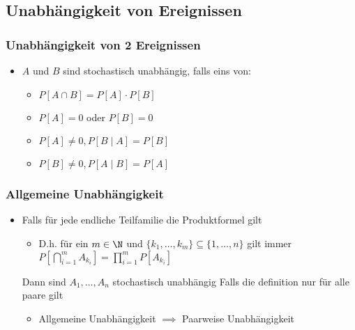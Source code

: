 \subsection{Unabhängigkeit von Ereignissen}
\subsubsection{Unabhängigkeit von 2 Ereignissen}
\begin{itemize}
    \item $A$ und $B$ sind stochastisch unabhängig, falls eins von:
        \begin{itemize}
            \item $P[A \cap B] = P[A] \cdot P[B]$
            \item $P[A]=0$ oder $P[B] = 0$
            \item $P[A] \neq 0, P[B \mid A] = P[B]$
            \item $P[B] \neq 0, P[A \mid B] = P[A]$
        \end{itemize}
\end{itemize}

\subsubsection{Allgemeine Unabhängigkeit}
\begin{itemize}
    \item Falls für jede endliche Teilfamilie die Produktformel gilt
        \begin{itemize}
            \item D.h. für ein $m \in \N$ und $\{k_1,\dots, k_m\} \subseteq \{1, \dots, n\}$ gilt immer $ P \left[ \bigcap_{i=1}^m A_{k_i} \right] = \prod_{i=1}^m P[A_{k_i}]$
        \end{itemize}
    Dann sind $A_1, \dots, A_n$ stochastisch unabhängig
     Falls die definition nur für alle paare gilt
        \begin{itemize}
            \item Allgemeine Unabhängigkeit $\implies$ Paarweise Unabhängigkeit
        \end{itemize}
\end{itemize}
